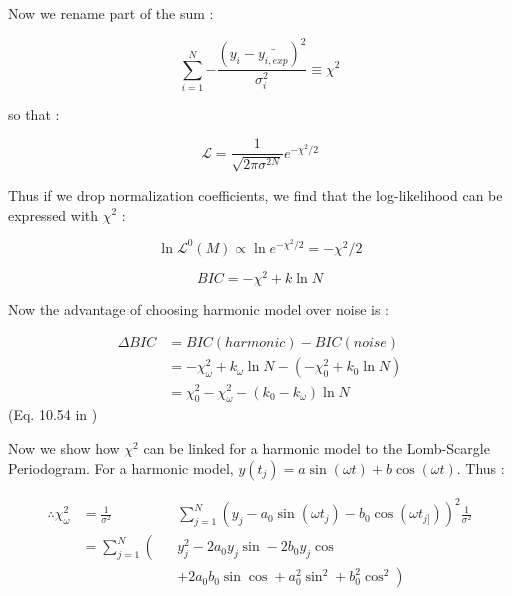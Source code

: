 \documentclass[fleqn,usenatbib]{mnras}  %
\begin{document}
Now we rename part of the sum : 

\begin{equation}
\sum_{i=1}^{N}{-\frac{\left( y_{i} - \bar{y_{i,exp}} \right)^{2} }  { \sigma_{i}^{2}}  } \equiv \chi^{2} 
\end{equation}



so that : 

\begin{equation}
\mathcal{L}  = \frac{1}{\sqrt{2 \pi \sigma^{2N}}} e^{- \chi^{2} / 2 }
\end{equation}

Thus if we drop normalization coefficients, we find that the log-likelihood can be expressed with $\chi^2$ : 

\begin{equation}
\ln \mathcal{L}^{0}(M) \propto \ln e^{- \chi^{2} / 2 } = - \chi^{2} / 2
\end{equation}

\begin{equation}
BIC = -\chi^{2} + k \ln {N}
\end{equation}


Now the advantage of choosing harmonic model over noise is : 

\begin{equation}
	\begin{split}
	\Delta BIC & = BIC(harmonic) - BIC(noise) \\
	           & = - \chi^{2}_{\omega} + k_{\omega} \ln {N} - (- \chi^{2}_{0} + k_{0} \ln {N}) \\
	           & = \chi^{2}_{0} - \chi^{2}_{\omega} - (k_{0} - k_{\omega}) \ln {N}
	\end{split}
\end{equation}
(Eq. 10.54 in \citep{ivezic2014})


Now we show how $\chi^{2}$ can be linked for a harmonic model to the Lomb-Scargle Periodogram. 
For a harmonic model, $y(t_{j}) = a \sin(\omega t) + b \cos(\omega t)$. Thus : 

\begin{equation} 
	\begin{alignedat}{2}
	\therefore \chi^{2}_{\omega} &= \frac{1}{\sigma^{2}} &&\displaystyle\sum_{j=1}^{N}{\left( y_{j} - a_{0} \sin(\omega t_{j}) - b_{0} \cos(\omega t_{j]})\right)^{2}}  \frac{1}{\sigma^{2}}  \\
	&= \sum_{j=1}^{N} \left(\right. &&y_{j}^{2} - 2 a_{0}y_{j}\sin - 2 b_{0} y_{j}\cos \\
	& &&+2 a_{0}b_{0}\sin \cos + a_{0}^{2}\sin^{2} + b_{0}^{2}\cos^{2}  \left. \right) 
	\end{alignedat}
\end{equation}
\end{document}
